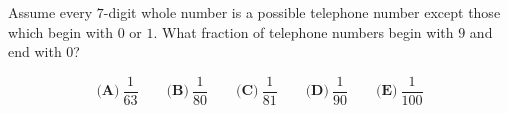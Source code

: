 Assume every $ 7$-digit whole number is a possible telephone number except those which begin with $ 0$ or $ 1$.  What fraction of telephone numbers begin with $ 9$ and end with $ 0$?



\[ \textbf{(A)}\ \dfrac{1}{63} \qquad
\textbf{(B)}\ \dfrac{1}{80} \qquad
\textbf{(C)}\ \dfrac{1}{81} \qquad
\textbf{(D)}\ \dfrac{1}{90} \qquad
\textbf{(E)}\ \dfrac{1}{100}
\]
